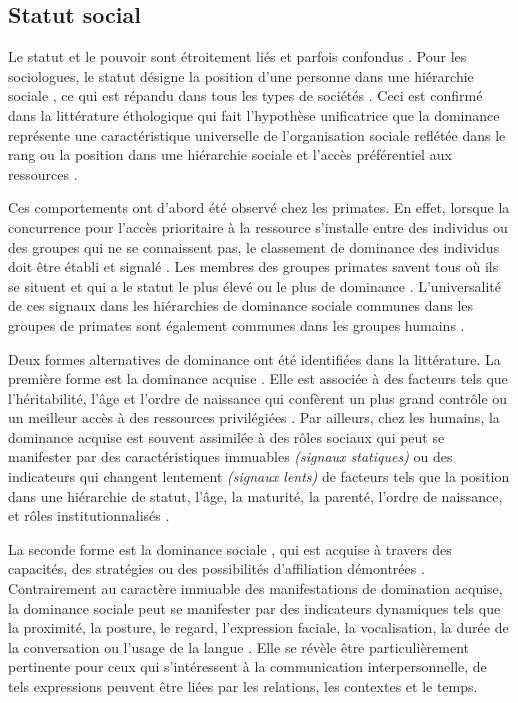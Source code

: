\subsection{Statut social}

	Le statut et le pouvoir sont étroitement liés et parfois confondus \cite{burgoon1998nature}. Pour les sociologues, le statut désigne la position d'une personne dans une hiérarchie sociale \cite{ellyson1985power}, ce qui est répandu dans tous les types de sociétés \cite{lips1991women}.
	Ceci est confirmé  dans la littérature éthologique qui fait l'hypothèse unificatrice que la dominance représente une caractéristique universelle de l'organisation sociale reflétée dans le rang ou la position dans une hiérarchie sociale \cite{burgoon1998nature} et l'accès préférentiel aux ressources \cite{liska1990dominance}.
	
	Ces comportements ont d'abord été observé chez les primates. En effet, lorsque la concurrence pour l'accès prioritaire à la ressource s'installe entre des individus ou des groupes qui ne se connaissent pas, le classement de dominance des individus doit être établi et signalé \cite{burgoon1998nature}. Les membres des groupes primates savent tous où ils se situent et qui a le statut le plus élevé ou le plus de dominance \cite{smither1993authoritarianism}.
	L'universalité de ces signaux  dans les hiérarchies de dominance sociale communes dans les groupes de primates sont également communes dans les groupes humains \cite{burgoon1998nature}.
	
	Deux formes alternatives de dominance ont été identifiées dans la littérature.
	La première forme est la dominance acquise \cite{liska1990dominance}. Elle est associée à des facteurs tels que l'héritabilité, l'âge et l'ordre de naissance qui confèrent un plus grand contrôle ou un meilleur accès à des ressources privilégiées \cite{cattell1970handbook}.
	Par ailleurs, chez les humains, la dominance acquise est souvent assimilée à des rôles sociaux qui peut se manifester par des caractéristiques immuables \textit{(signaux statiques)} ou des indicateurs qui changent lentement \textit{(signaux lents)} de facteurs tels que la position dans une hiérarchie de statut, l'âge, la maturité, la parenté, l'ordre de naissance, et rôles institutionnalisés \cite{burgoonnonverbal}. 
	
	La seconde forme est la dominance sociale \cite{liska1990dominance}, qui est acquise à travers des capacités, des stratégies ou des possibilités d'affiliation démontrées \cite{burgoon1998nature}. Contrairement au caractère immuable des manifestations de domination acquise, la dominance sociale peut se manifester par des indicateurs dynamiques tels que la proximité, la posture, le regard, l'expression faciale, la vocalisation, la durée de la conversation ou l'usage de la langue \cite{keating1985human}. Elle se révèle être particulièrement pertinente pour ceux qui s'intéressent à la communication interpersonnelle, de tels expressions peuvent être liées par les relations, les contextes et le temps\cite{burgoon1998nature}.
		
